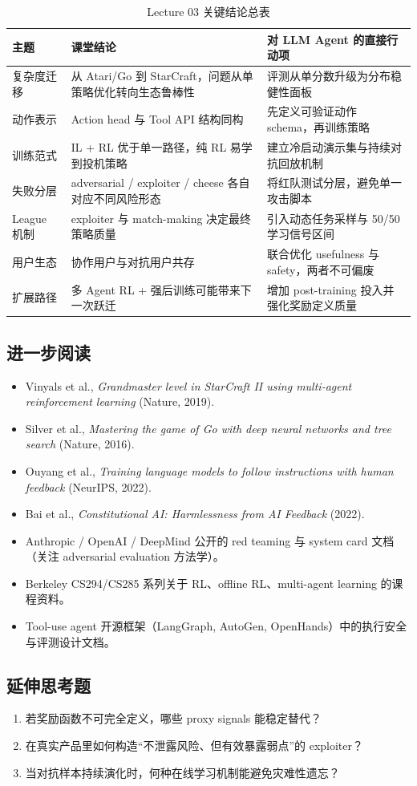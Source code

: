 \documentclass[a4paper]{article}
\begin{document}
\begin{table}[H]
\centering
\caption{Lecture 03 关键结论总表}
\begin{tabular}{p{2.8cm}p{4.6cm}p{5.2cm}}
\toprule
主题 & 课堂结论 & 对 LLM Agent 的直接行动项 \\
\midrule
复杂度迁移 & 从 Atari/Go 到 StarCraft，问题从单策略优化转向生态鲁棒性 & 评测从单分数升级为分布稳健性面板 \\
动作表示 & Action head 与 Tool API 结构同构 & 先定义可验证动作 schema，再训练策略 \\
训练范式 & IL + RL 优于单一路径，纯 RL 易学到投机策略 & 建立冷启动演示集与持续对抗回放机制 \\
失败分层 & adversarial / exploiter / cheese 各自对应不同风险形态 & 将红队测试分层，避免单一攻击脚本 \\
League 机制 & exploiter 与 match-making 决定最终策略质量 & 引入动态任务采样与 50/50 学习信号区间 \\
用户生态 & 协作用户与对抗用户共存 & 联合优化 usefulness 与 safety，两者不可偏废 \\
扩展路径 & 多 Agent RL + 强后训练可能带来下一次跃迁 & 增加 post-training 投入并强化奖励定义质量 \\
\bottomrule
\end{tabular}
\end{table}

\subsection*{进一步阅读}
\begin{itemize}
    \item Vinyals et al., \textit{Grandmaster level in StarCraft II using multi-agent reinforcement learning} (Nature, 2019).
    \item Silver et al., \textit{Mastering the game of Go with deep neural networks and tree search} (Nature, 2016).
    \item Ouyang et al., \textit{Training language models to follow instructions with human feedback} (NeurIPS, 2022).
    \item Bai et al., \textit{Constitutional AI: Harmlessness from AI Feedback} (2022).
    \item Anthropic / OpenAI / DeepMind 公开的 red teaming 与 system card 文档（关注 adversarial evaluation 方法学）。
    \item Berkeley CS294/CS285 系列关于 RL、offline RL、multi-agent learning 的课程资料。
    \item Tool-use agent 开源框架（LangGraph, AutoGen, OpenHands）中的执行安全与评测设计文档。
\end{itemize}

\subsection*{延伸思考题}
\begin{enumerate}
    \item 若奖励函数不可完全定义，哪些 proxy signals 能稳定替代？
    \item 在真实产品里如何构造``不泄露风险、但有效暴露弱点''的 exploiter？
    \item 当对抗样本持续演化时，何种在线学习机制能避免灾难性遗忘？
\end{enumerate}
\end{document}
